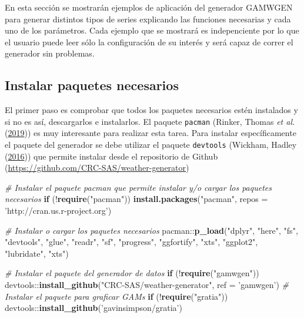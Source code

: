 \documentclass[
  12pt]{article}
\newenvironment{Shaded}{}{}
\newcommand{\CommentTok}[1]{\textcolor[rgb]{0.38,0.63,0.69}{\textit{#1}}}
\newcommand{\ControlFlowTok}[1]{\textcolor[rgb]{0.00,0.44,0.13}{\textbf{#1}}}
\newcommand{\DataTypeTok}[1]{\textcolor[rgb]{0.56,0.13,0.00}{#1}}
\newcommand{\KeywordTok}[1]{\textcolor[rgb]{0.00,0.44,0.13}{\textbf{#1}}}
\newcommand{\NormalTok}[1]{#1}
\newcommand{\OperatorTok}[1]{\textcolor[rgb]{0.40,0.40,0.40}{#1}}
\newcommand{\StringTok}[1]{\textcolor[rgb]{0.25,0.44,0.63}{#1}}
\begin{document}
En esta sección se mostrarán ejemplos de aplicación del generador GAMWGEN para generar distintos tipos de series explicando las funciones necesarias y cada uno de los parámetros. Cada ejemplo que se mostrará es indepenciente por lo que el usuario puede leer sólo la configuración de su interés y será capaz de correr el generador sin problemas.

\hypertarget{instalar-paquetes-necesarios}{%
\subsection{Instalar paquetes necesarios}\label{instalar-paquetes-necesarios}}

El primer paso es comprobar que todos los paquetes necesarios estén instalados y si no es así, descargarlos e instalarlos. El paquete \texttt{pacman} (Rinker, Thomas \emph{et al.} (\protect\hyperlink{ref-RN5394}{2019})) es muy interesante para realizar esta tarea. Para instalar específicamente el paquete del generador se debe utilizar el paquete \texttt{devtools} (Wickham, Hadley (\protect\hyperlink{ref-RN5395}{2016})) que permite instalar desde el repositorio de Github (\url{https://github.com/CRC-SAS/weather-generator})

\begin{Shaded}
\begin{Highlighting}[]
\CommentTok{# Instalar el paquete pacman que permite instalar y/o cargar los paquetes necesarios}
\ControlFlowTok{if}\NormalTok{ (}\OperatorTok{!}\KeywordTok{require}\NormalTok{(}\StringTok{"pacman"}\NormalTok{)) }\KeywordTok{install.packages}\NormalTok{(}\StringTok{"pacman"}\NormalTok{, }\DataTypeTok{repos =} \StringTok{'http://cran.us.r-project.org'}\NormalTok{)}

\CommentTok{# Instalar o cargar los paquetes necesarios}
\NormalTok{pacman}\OperatorTok{::}\KeywordTok{p_load}\NormalTok{(}\StringTok{"dplyr"}\NormalTok{, }\StringTok{"here"}\NormalTok{, }\StringTok{"fs"}\NormalTok{, }\StringTok{"devtools"}\NormalTok{, }\StringTok{"glue"}\NormalTok{, }\StringTok{"readr"}\NormalTok{, }\StringTok{"sf"}\NormalTok{, }\StringTok{"progress"}\NormalTok{, }\StringTok{"ggfortify"}\NormalTok{, }\StringTok{"xts"}\NormalTok{, }\StringTok{"ggplot2"}\NormalTok{, }\StringTok{"lubridate"}\NormalTok{, }\StringTok{"xts"}\NormalTok{)}

\CommentTok{# Instalar el paquete del generador de datos}
\ControlFlowTok{if}\NormalTok{ (}\OperatorTok{!}\KeywordTok{require}\NormalTok{(}\StringTok{"gamwgen"}\NormalTok{)) devtools}\OperatorTok{::}\KeywordTok{install_github}\NormalTok{(}\StringTok{"CRC-SAS/weather-generator"}\NormalTok{,}
                                                  \DataTypeTok{ref =} \StringTok{'gamwgen'}\NormalTok{)}
\CommentTok{# Instalar el paquete para graficar GAMs}
\ControlFlowTok{if}\NormalTok{ (}\OperatorTok{!}\KeywordTok{require}\NormalTok{(}\StringTok{"gratia"}\NormalTok{))  devtools}\OperatorTok{::}\KeywordTok{install_github}\NormalTok{(}\StringTok{'gavinsimpson/gratia'}\NormalTok{)}
\end{Highlighting}
\end{Shaded}
\end{document}
